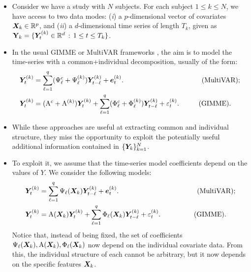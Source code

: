 \begin{itemize}
	\item Consider we have a study with $N$ subjects. For each subject $1\leq k\leq N$, we have access to two data modes: (\textit{i}) a $p$-dimensional vector of covariates $\bm{X}_k\in\mathbb{R}^{p}$, and (\textit{ii}) a $d$-dimensional time series of length $T_k$, given as $\mathbf{Y}_k = \{\bm{Y}_t^{(k)}\in\mathbb{R}^{d} \,:\, 1\leq t\leq T_k\}$.
	
	\item In the usual GIMME or MultiVAR frameworks \citep{gates2012group,fisher2022penalized}, the aim is to model the time-series with a common+individual decomposition, usually of the form:
	\begin{align*}
		\bY^{(k)}_t &= \sum_{\ell=1}^{q} (\Psi_\ell^{c} + \Psi_\ell^{(k)}) \bY_{t-\ell}^{(k)} + \be^{(k)}_{t}.\hspace{40mm} \text{(MultiVAR)};\\
		\bY^{(k)}_t &= (\Ar^{c} + \Ar^{(k)}) \bY^{(k)}_t + \sum_{\ell=1}^{q} (\Phi_\ell^{c} + \Phi_\ell^{(k)}) \bY_{t-\ell}^{(k)} + \varepsilon^{(k)}_{t}.\hspace{10mm} \text{(GIMME)}.
	\end{align*}
	
	\item While these approaches are useful at extracting common and individual structure, they miss the opportunity to exploit the potentially useful additional information contained in $\{\bm{Y}_k\}_{k=1}^N$. 
	
	\item To exploit it, we assume that the time-series model coefficients depend on the values of $Y$. We consider the following models: 
	\begin{align}
		\bY^{(k)}_t &= \sum_{\ell=1}^{q} \Psi_\ell(\bX_k) \bY_{t-\ell}^{(k)} + \be^{(k)}_{t}.\hspace{40mm} \text{(MultiVAR)}; \label{eq:rvar}\\
		\bY^{(k)}_t &= \Ar(\bX_k) \bY^{(k)}_t + \sum_{\ell=1}^{q} \Phi_\ell(\bX_k) \bY_{t-\ell}^{(k)} + \varepsilon^{(k)}_{t}.\hspace{17mm} \text{(GIMME)}.
	\end{align}
	Notice that, instead of being fixed, the set of coefficients $\Psi_\ell(\bm{X}_k), \mathrm{A}(\bm{X}_k), \Phi_\ell(\bm{X}_k)$ now depend on the individual covariate data. From this, the individual structure of each cannot be arbitrary, but it now depends on the specific features $\bm{X}_k$.
	

\end{itemize}
